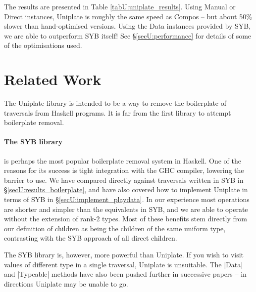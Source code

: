 \begin{comment}
\begin{figure}
\texttt{[image: graph.ps]}
\caption{Timing results, relative to Raw.}
\label{figU:graph}
\end{figure}
\end{comment}

The results are presented in Table \ref{tabU:uniplate_results}. Using Manual or Direct instances, Uniplate is roughly the same speed as Compos -- but about 50\% slower than hand-optimised versions. Using the Data instances provided by SYB, we are able to outperform SYB itself! See \S\ref{secU:performance} for details of some of the optimisations used.


\section{Related Work}
\label{secU:related}

The Uniplate library is intended to be a way to remove the boilerplate of traversals from Haskell programs. It is far from the first library to attempt boilerplate removal.

\paragraph{The SYB library} \citep{lammel:syb} is perhaps the most popular boilerplate removal system in Haskell. One of the reasons for its success is tight integration with the GHC compiler, lowering the barrier to use. We have compared directly against traversals written in SYB in \S\ref{secU:results_boilerplate}, and have also covered how to implement Uniplate in terms of SYB in \S\ref{secU:implement_playdata}. In our experience most operations are shorter and simpler than the equivalents in SYB, and we are able to operate without the extension of rank-2 types. Most of these benefits stem directly from our definition of children as being the children of the same uniform type, contrasting with the SYB approach of all direct children.

The SYB library is, however, more powerful than Uniplate. If you wish to visit values of different type in a single traversal, Uniplate is unsuitable. The |Data| and |Typeable| methods have also been pushed further in successive papers \citep{lammel:syb2,lammel:syb3} -- in directions Uniplate may be unable to go.

